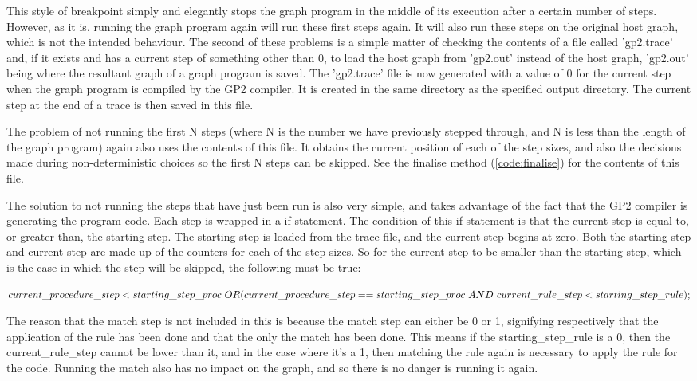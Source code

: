\documentclass{UoYCSproject}
\begin{document}
This style of breakpoint simply and elegantly stops the graph program in the middle of its execution after a certain number of steps. However, as it is, running the graph program again will run these first steps again. It will also run these steps on the original host graph, which is not the intended behaviour. The second of these problems is a simple matter of checking the contents of a file called 'gp2.trace' and, if it exists and has a current step of something other than 0, to load the host graph from 'gp2.out' instead of the host graph, 'gp2.out' being where the resultant graph of a graph program is saved. The 'gp2.trace' file is now generated with a value of 0 for the current step when the graph program is compiled by the GP2 compiler. It is created in the same directory as the specified output directory. The current step at the end of a trace is then saved in this file. 

The problem of not running the first N steps (where N is the number we have previously stepped through, and N is less than the length of the graph program) again also uses the contents of this file. It obtains the current position of each of the step sizes, and also the decisions made during non-deterministic choices so the first N steps can be skipped. See the finalise method (\ref{code:finalise}) for the contents of this file.

The solution to not running the steps that have just been run is also very simple, and takes advantage of the fact that the GP2 compiler is generating the program code. Each step is wrapped in a if statement. The condition of this if statement is that the current step is equal to, or greater than, the starting step. The starting step is loaded from the trace file, and the current step begins at zero. Both the starting step and current step are made up of the counters for each of the step sizes. So for the current step to be smaller than the starting step, which is the case in which the step will be skipped, the following must be true:

$current\_procedure\_step < starting\_step\_proc\ OR \\
(current\_procedure\_step == starting\_step\_proc\ AND\ current\_rule\_step < starting\_step\_rule);$

The reason that the match step is not included in this is because the match step can either be 0 or 1, signifying respectively that the application of the rule has been done and that the only the match has been done. This means if the starting\_step\_rule is a 0, then the current\_rule\_step cannot be lower than it, and in the case where it's a 1, then matching the rule again is necessary to apply the rule for the code. Running the match also has no impact on the graph, and so there is no danger is running it again.
\end{document}
